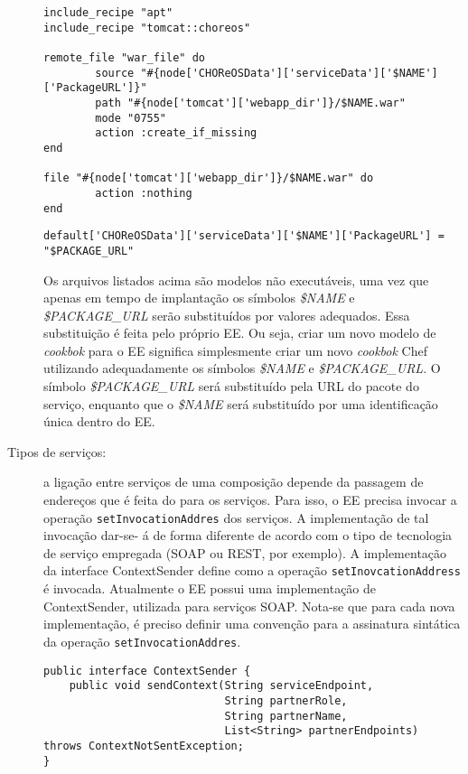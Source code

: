 \begin{description}
\begin{lstlisting}[frame=trbl, label=lst:recipe_template, caption=Receita modelo para a implantação de WARs.]
include_recipe "apt" 
include_recipe "tomcat::choreos"

remote_file "war_file" do
        source "#{node['CHOReOSData']['serviceData']['$NAME']['PackageURL']}"
        path "#{node['tomcat']['webapp_dir']}/$NAME.war"
        mode "0755"
        action :create_if_missing
end

file "#{node['tomcat']['webapp_dir']}/$NAME.war" do
        action :nothing
end
\end{lstlisting}

\begin{lstlisting}[frame=trbl, label=lst:attributes_template, caption=Arquivo modelo de atributos para a implantação de WARs.]
default['CHOReOSData']['serviceData']['$NAME']['PackageURL'] = "$PACKAGE_URL"
\end{lstlisting}

Os arquivos listados acima são modelos não executáveis, uma vez que apenas em tempo de implantação 
os símbolos \emph{\$NAME} e \emph{\$PACKAGE\_URL} serão substituídos por valores adequados.
Essa substituição é feita pelo próprio EE.
Ou seja, criar um novo modelo de \emph{cookbok} para o EE significa simplesmente criar um novo \emph{cookbok} Chef
utilizando adequadamente os símbolos \emph{\$NAME} e \emph{\$PACKAGE\_URL}.
O símbolo \emph{\$PACKAGE\_URL} será substituído pela URL do pacote do serviço,
enquanto que o \emph{\$NAME} será substituído por uma identificação única dentro do EE.


\item [Tipos de serviços:] a ligação entre serviços de uma composição depende da passagem de endereços que é feita do \ee para os 
serviços. Para isso, o EE precisa invocar a operação \texttt{setInvocationAddres} dos serviços. A implementação de tal invocação dar-se-
á de forma diferente de acordo com o tipo de tecnologia de serviço empregada (SOAP ou REST, por exemplo). 
A implementação da interface \textsf{ContextSender} define como a operação \texttt{setInovcationAddress} é invocada. 
Atualmente o EE possui uma implementação de \textsf{ContextSender}, utilizada para serviços SOAP.
Nota-se que para cada nova implementação, é preciso definir uma convenção para a assinatura sintática da operação \texttt
{setInvocationAddres}.

\begin{lstlisting}[frame=trbl, label=lst:context_sender, caption=Interface ContextSender.]
public interface ContextSender {
    public void sendContext(String serviceEndpoint, 
                            String partnerRole, 
                            String partnerName, 
                            List<String> partnerEndpoints) throws ContextNotSentException;
}
\end{lstlisting}

\end{description}


